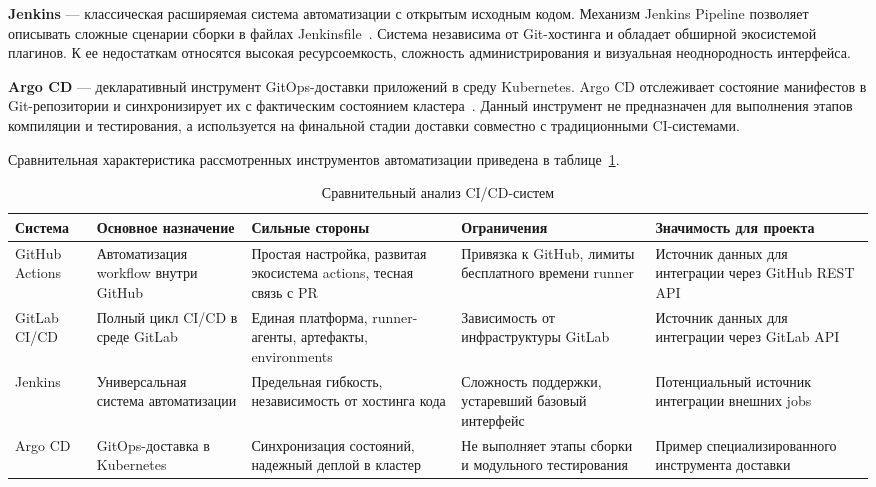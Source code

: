 \textbf{Jenkins} --- классическая расширяемая система автоматизации с открытым исходным кодом. Механизм Jenkins Pipeline позволяет описывать сложные сценарии сборки в файлах Jenkinsfile~\cite{jenkins_pipeline_docs}. Система независима от Git-хостинга и обладает обширной экосистемой плагинов. К ее недостаткам относятся высокая ресурсоемкость, сложность администрирования и визуальная неоднородность интерфейса.

\textbf{Argo CD} --- декларативный инструмент GitOps-доставки приложений в среду Kubernetes. Argo CD отслеживает состояние манифестов в Git-репозитории и синхронизирует их с фактическим состоянием кластера~\cite{argo_cd_docs}. Данный инструмент не предназначен для выполнения этапов компиляции и тестирования, а используется на финальной стадии доставки совместно с традиционными CI-системами.

Сравнительная характеристика рассмотренных инструментов автоматизации приведена в таблице~\ref{tab:cicd_compare}.

\begin{table}[H]
    \centering
    \caption{Сравнительный анализ CI/CD-систем}
    \label{tab:cicd_compare}
    \small
    \begin{tabular}{|p{2.4cm}|p{3.1cm}|p{3.1cm}|p{3.2cm}|p{3.2cm}|}
        \hline
        \textbf{Система} & \textbf{Основное назначение} & \textbf{Сильные стороны} & \textbf{Ограничения} & \textbf{Значимость для проекта} \\ \hline
        GitHub Actions & Автоматизация workflow внутри GitHub & Простая настройка, развитая экосистема actions, тесная связь с PR & Привязка к GitHub, лимиты бесплатного времени runner & Источник данных для интеграции через GitHub REST API \\ \hline
        GitLab CI/CD & Полный цикл CI/CD в среде GitLab & Единая платформа, runner-агенты, артефакты, environments & Зависимость от инфраструктуры GitLab & Источник данных для интеграции через GitLab API \\ \hline
        Jenkins & Универсальная система автоматизации & Предельная гибкость, независимость от хостинга кода & Сложность поддержки, устаревший базовый интерфейс & Потенциальный источник интеграции внешних jobs \\ \hline
        Argo CD & GitOps-доставка в Kubernetes & Синхронизация состояний, надежный деплой в кластер & Не выполняет этапы сборки и модульного тестирования & Пример специализированного инструмента доставки \\ \hline
    \end{tabular}
\end{table}

